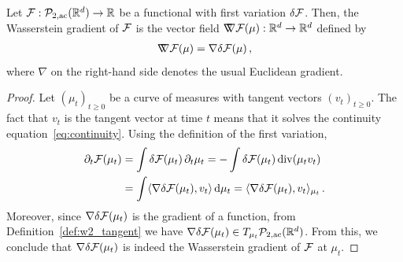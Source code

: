 \begin{proposition}\label{prop:w2_grad}
    Let $\mathcal{F} : \mathcal{P}_{2,\rm ac}(\mathbb{R}^d) \to\mathbb{R}$ be a functional with first variation $\delta \mathcal{F}$.
    Then, the Wasserstein gradient of $\mathcal{F}$ is the vector field $ \nabla\mkern-10mu\nabla \mathcal{F}(\mu): \mathbb{R}^d \to \mathbb{R}^d$ defined by
    \begin{align*}
        \nabla\mkern-10mu\nabla \mathcal{F}(\mu) = \nabla \delta \mathcal{F}(\mu)\,,
    \end{align*}
    where $\nabla$ on the right-hand side denotes the usual Euclidean gradient.
\end{proposition}
\begin{proof}
    Let ${(\mu_t)}_{t\geq 0}$ be a curve of measures with tangent vectors ${(v_t)}_{t\geq 0}$.
    The fact that $v_t$ is the tangent vector at time $t$ means that it solves the continuity equation~\eqref{eq:continuity}.
    Using the definition of the first variation,
    \begin{align*}
        \partial_t \mathcal{F}(\mu_t)
        &= \int \delta \mathcal{F}(\mu_t)\,\partial_t \mu_t
        = -\int \delta \mathcal{F}(\mu_t) \operatorname{div}(\mu_t v_t)\\
        &= \int \langle \nabla \delta \mathcal{F}(\mu_t), v_t\rangle\,\mathrm{d} \mu_t
        = \langle \nabla \delta \mathcal{F}(\mu_t), v_t\rangle_{\mu_t}\,.
    \end{align*}
    Moreover, since $\nabla \delta \mathcal{F}(\mu_t)$ is the gradient of a function, from Definition~\ref{def:w2_tangent} we have $\nabla \delta \mathcal{F}(\mu_t) \in T_{\mu_t} \mathcal{P}_{2,\rm ac}(\mathbb{R}^d)$.
    From this, we conclude that $\nabla \delta \mathcal{F}(\mu_t)$ is indeed the Wasserstein gradient of $\mathcal{F}$ at $\mu_t$.
\end{proof}
